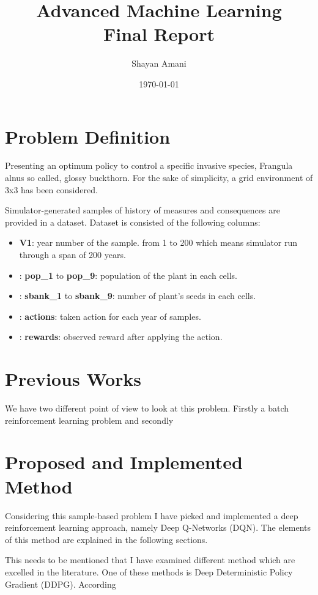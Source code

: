 \documentclass[12pt]{report}
\title{Advanced Machine Learning\\Final Report}
\author{Shayan Amani}
\date{\today}
\begin{document}
\maketitle

\chapter{Problem Definition}
Presenting an optimum policy to control a specific invasive species, Frangula alnus so called, glossy buckthorn. For the sake of simplicity, a grid environment of 3x3 has been considered. 

Simulator-generated samples of history of measures and consequences are provided in a dataset. Dataset is consisted of the following columns:
\begin{itemize}
    \item \textbf{V1}: year number of the sample. from 1 to 200 which means simulator run through a span of 200 years.
    \item: \textbf{pop\_1} to \textbf{pop\_9}: population of the plant in each cells.
    \item: \textbf{sbank\_1} to \textbf{sbank\_9}: number of plant's seeds in each cells.
    \item: \textbf{actions}: taken action for each year of samples.
    \item: \textbf{rewards}: observed reward after applying the action.
\end{itemize}

\chapter{Previous Works}
We have two different point of view to look at this problem. Firstly a batch reinforcement learning problem and secondly




\chapter{Proposed and Implemented Method}
Considering this sample-based problem I have picked and implemented a deep reinforcement learning approach, namely Deep Q-Networks (DQN). The elements of this method are explained in the following sections.

This needs to be mentioned that I have examined different method which are excelled in the literature. One of these methods is Deep Deterministic Policy Gradient (DDPG). According 
\end{document}
